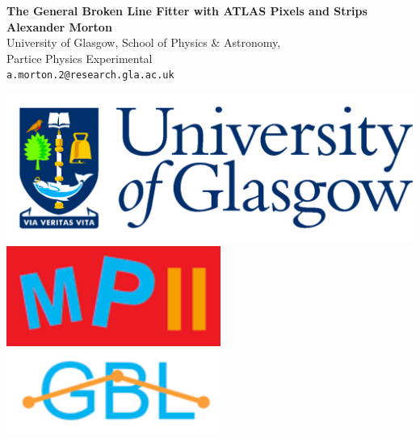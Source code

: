 \documentclass[a0,portrait]{a0poster}
\begin{document}
\newcommand{\bra}[1]{\langle #1|}

\newcommand{\ket}[1]{|#1\rangle}

\newcommand{\braket}[2]{\langle #1|#2\rangle}



\begin{minipage}[b]{0.75\linewidth}
\veryHuge \color{NavyBlue} \textbf{The General Broken Line Fitter with ATLAS Pixels and Strips} \color{Black}\\ \vspace{1cm} %
\huge \textbf{Alexander Morton}\\[0.5cm] %
\huge University of Glasgow, School of Physics \& Astronomy, \\ Partice Physics Experimental\\[0.4cm] %
\Large \texttt{a.morton.2@research.gla.ac.uk}
\end{minipage}
%
\begin{minipage}[b]{0.25\linewidth}
\includegraphics[width=20cm]{GlaUni.png}\\
\includegraphics[width=7cm]{mp2-logo.png} \hspace{3cm} \includegraphics[width=7cm]{gbl-logo.png}\\
\end{minipage}
\end{document}
